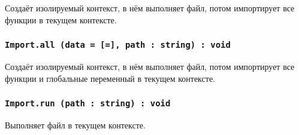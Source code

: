 Создаёт изолируемый контекст, в нём выполняет файл, потом импортирует все функции в текущем контексте.

\subsubsection{\lstinline|Import.all (data = [=], path : string) : void|}

Создаёт изолируемый контекст, в нём выполняет файл, потом импортирует все функции и глобальные переменный в текущем контексте.

\subsubsection{\lstinline|Import.run (path : string) : void|}

Выполняет файл в текущем контексте.

